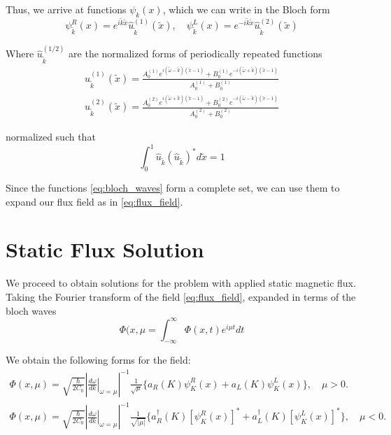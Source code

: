 Thus, we arrive at functions $\psi_{k}(x)$, which we can write in the Bloch form
\begin{equation}\label{eq:bloch_waves}
    \psi_{\tilde{k}}^R (x) =e^{i\tilde{k}\tilde{x}} \hat{u}_{\tilde{k}}^{(1)}(\tilde{x}), \hspace{12pt}  \psi_{\tilde{k}}^L(x) =e^{-i\tilde{k}\tilde{x}} \hat{u}_{\tilde{k}}^{(2)}(\tilde{x}) 
\end{equation}

Where $\hat{u}_{\tilde{k}}^{(1/2)}$ are the normalized forms of periodically repeated functions
\begin{gather}
      u_{\tilde{k}}^{(1)}(\tilde{x}) = 
      \frac{A_0^{(1)} e^{i(\tilde{\omega}-\tilde{k})(\tilde{x}-1)} + B_0^{(1)} e^{-i(\tilde{\omega}+\tilde{k})(\tilde{x}-1)}}{A_0^{(1)}+B_0^{(1)}}\\
       u_{\tilde{k}}^{(2)}(\tilde{x}) =
      \frac{A_0^{(2)} e^{i(\tilde{\omega}+\tilde{k})(\tilde{x}-1)} + B_0^{(2)} e^{-i(\tilde{\omega}-\tilde{k})(\tilde{x}-1)}}{A_0^{(2)}+B_0^{(2)}}
\end{gather}

normalized such that
\begin{equation}
\int_0^1 \hat{u}_{\tilde{k}} (\hat{u}_{\tilde{k}})^* d\tilde{x} = 1
\end{equation}

Since the functions \ref{eq:bloch_waves} form a complete set, we can use them to expand our flux field as in \ref{eq:flux_field}.

\section{Static Flux Solution}\label{eq:Static_Flux}

We proceed to obtain solutions for the problem with applied static magnetic flux. Taking the Fourier transform of the field \ref{eq:flux_field}, expanded in terms of the bloch waves
\begin{equation}
    \Phi(x, \mu = \int_{-\infty}^\infty \Phi(x,t) e^{i\mu t} dt
\end{equation}

We obtain the following forms for the field:
\begin{gather}
    \Phi(x,\mu) = \sqrt{\frac{\hbar}{2 C_0}} \left| \left.\frac{d\omega}{dk}\right|_{\omega=\mu}\right|^{-1}\frac{1}{\sqrt{\mu}}\biggl\lbrace a_R(K) \psi^R_K(x) + a_L(K)\psi_K^L(x)\biggr\rbrace, \hspace{12pt} \mu > 0.\\
    \Phi(x,\mu) = \sqrt{\frac{\hbar}{2 C_0}} \left| \left.\frac{d\omega}{dk}\right|_{\omega=\mu}\right|^{-1}\frac{1}{\sqrt{|\mu|}}\biggl\lbrace a_R^\dagger(K) \left[\psi^R_K(x)\right]^* + a_L^\dagger(K)\left[\psi_K^L(x)\right]^*\biggr\rbrace, \hspace{12pt} \mu < 0.
\end{gather}

